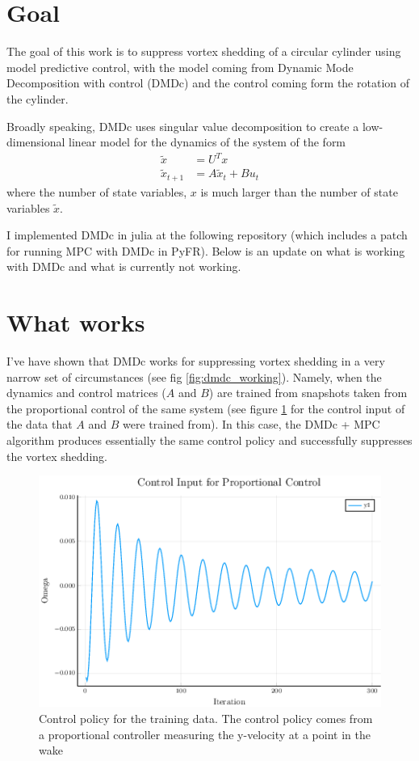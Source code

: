 \documentclass{article}
\begin{document}
\section*{Goal}
The goal of this work is to suppress vortex shedding of a circular cylinder using model predictive control, with the model coming from Dynamic Mode Decomposition with control (DMDc) and the control coming form the rotation of the cylinder.

Broadly speaking, DMDc uses singular value decomposition to create a low-dimensional linear model for the dynamics of the system of the form
\begin{align*}
\tilde{x} &= U^T x \\
\tilde{x}_{t+1} &= A \tilde{x}_t + B u_t
\end{align*}
where the number of state variables, $x$ is much larger than the number of state variables $\tilde{x}$.

I implemented DMDc in julia at the following repository (which includes a patch for running MPC with DMDc in PyFR). Below is an update on what is working with DMDc and what is currently not working.

\section*{What works}
I've have shown that DMDc works for suppressing vortex shedding in a very narrow set of circumstances (see fig \ref{fig:dmdc_working}). Namely, when the dynamics and control matrices ($A$ and $B$) are trained from snapshots taken from the proportional control of the same system (see figure \ref{fig:training_data} for the control input of the data that $A$ and $B$ were trained from). In this case, the DMDc + MPC algorithm produces essentially the same control policy and successfully suppresses the vortex shedding.


\begin{figure}
  \centering
  \includegraphics[scale=0.5]{../images/training_data.png}
  \caption{Control policy for the training data. The control policy comes from a proportional controller measuring the y-velocity at a point in the wake}
  \label{fig:training_data}
\end{figure}
\end{document}
